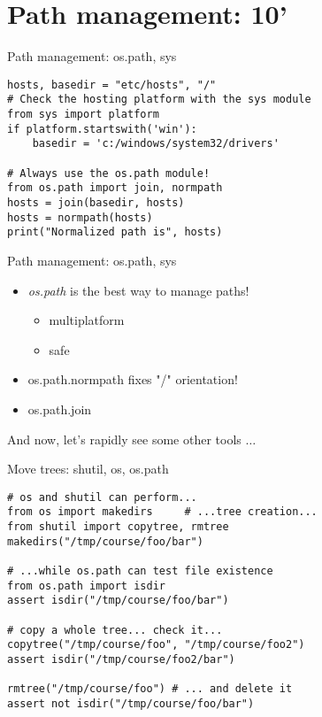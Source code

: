 \section{Path management: 10'}

\begin{frame}[fragile]{Path management: os.path, sys}
\begin{verbatim}
hosts, basedir = "etc/hosts", "/"
# Check the hosting platform with the sys module
from sys import platform
if platform.startswith('win'):
    basedir = 'c:/windows/system32/drivers'

# Always use the os.path module!
from os.path import join, normpath 
hosts = join(basedir, hosts)
hosts = normpath(hosts)
print("Normalized path is", hosts)
\end{verbatim}
\end{frame}

\begin{frame}[fragile]{Path management: os.path, sys}
\Large
\begin{itemize}
\item \emph{os.path} is the best way to manage paths!
\begin{itemize}
 \Large
 \item multiplatform
 \item safe
 \end{itemize}
 
\item os.path.normpath fixes "/" orientation!
\item os.path.join 
 \end{itemize}
And now, let's rapidly see some other tools $\ldots$
\end{frame}

\begin{frame}[fragile]{Move trees: shutil, os, os.path}
\begin{verbatim}
# os and shutil can perform...
from os import makedirs     # ...tree creation...
from shutil import copytree, rmtree 
makedirs("/tmp/course/foo/bar")

# ...while os.path can test file existence
from os.path import isdir            
assert isdir("/tmp/course/foo/bar")

# copy a whole tree... check it...
copytree("/tmp/course/foo", "/tmp/course/foo2") 
assert isdir("/tmp/course/foo2/bar")            

rmtree("/tmp/course/foo") # ... and delete it
assert not isdir("/tmp/course/foo/bar")
\end{verbatim}
\end{frame}

